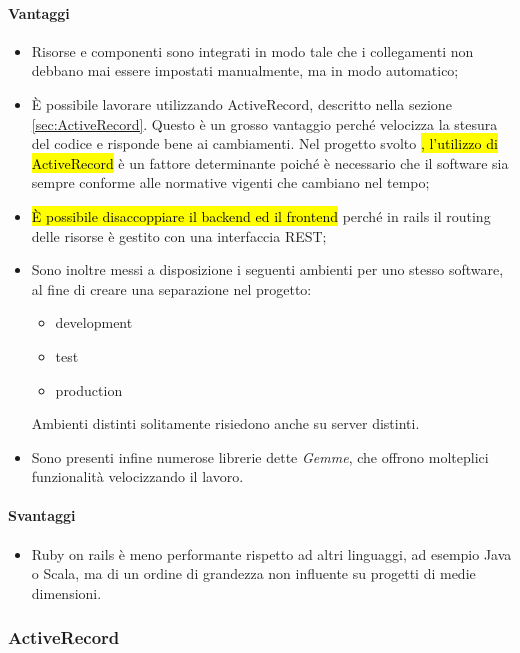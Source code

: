 \paragraph{Vantaggi}
\begin{itemize}
	\item Risorse e componenti sono integrati in modo tale che i collegamenti non debbano mai essere impostati manualmente, ma in modo automatico;
	\item È possibile lavorare utilizzando ActiveRecord, descritto nella sezione \ref{sec:ActiveRecord}. Questo è un grosso vantaggio perché velocizza la stesura del codice e risponde bene ai cambiamenti. Nel progetto svolto \hl{, l'utilizzo di ActiveRecord} è un fattore determinante poiché è necessario che il software sia sempre conforme alle normative vigenti che cambiano nel tempo;
	\item \hl{È possibile disaccoppiare il backend ed il frontend} perché in rails il routing delle risorse è gestito con una interfaccia REST;
	\item Sono inoltre messi a disposizione i seguenti ambienti per uno stesso software, al fine di creare una separazione nel progetto:
		\begin{itemize}
		\item development 
		\item test
		\item production
		\end{itemize} 
		Ambienti distinti solitamente risiedono anche su server distinti.
	\item Sono presenti infine numerose librerie dette \textit{Gemme}, che offrono molteplici funzionalità velocizzando il lavoro.
\end{itemize}
\paragraph{Svantaggi}
	\begin{itemize}
		\item Ruby on rails è meno performante rispetto ad altri linguaggi, ad esempio Java o Scala, ma di un ordine di grandezza non influente su progetti di medie dimensioni. 
	\end{itemize} 
		
\subsubsection{ActiveRecord}

